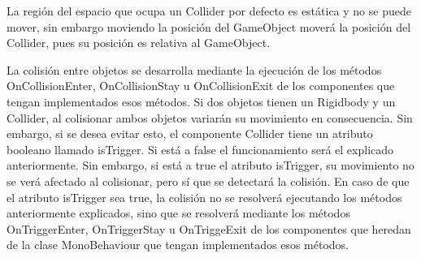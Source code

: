 La región del espacio que ocupa un Collider por defecto es estática y no se puede mover, sin embargo moviendo la posición del GameObject moverá la posición del Collider, pues su posición es relativa al GameObject.

La colisión entre objetos se desarrolla mediante la ejecución de los métodos OnCollisionEnter, OnCollisionStay u OnCollisionExit de los componentes que tengan implementados esos métodos. 
Si dos objetos tienen un Rigidbody y un Collider, al colisionar ambos objetos variarán su movimiento en consecuencia. Sin embargo, si se desea evitar esto, el componente Collider tiene un atributo booleano llamado isTrigger. Si está a false el funcionamiento será el explicado anteriormente. Sin embargo, si está a true el atributo isTrigger, su movimiento no se verá afectado al colisionar, pero sí que se detectará la colisión. En caso de que el atributo isTrigger sea true, la colisión no se resolverá ejecutando los métodos anteriormente explicados, sino que se resolverá mediante los métodos OnTriggerEnter, OnTriggerStay u OnTriggeExit de los componentes que heredan de la clase MonoBehaviour que tengan implementados esos métodos.

